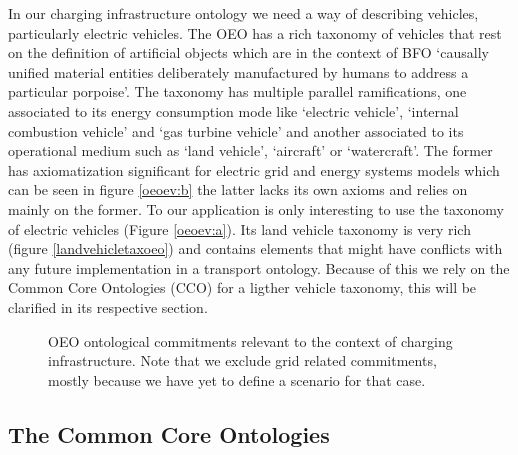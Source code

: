 In our charging infrastructure ontology we need a way of describing vehicles,
particularly electric vehicles. The OEO has a rich taxonomy of vehicles that
rest on the definition of artificial objects which are in the context of BFO
`causally unified material entities deliberately manufactured by humans to
address a particular porpoise'. The taxonomy has multiple parallel
ramifications, one associated to its energy consumption mode like `electric
vehicle', `internal combustion vehicle' and `gas turbine vehicle' and another
associated to its operational medium such as `land vehicle', `aircraft' or
`watercraft'. The former has axiomatization significant for electric grid and
energy systems models which can be seen in figure \ref{oeoev:b} the latter
lacks its own axioms and relies on mainly on the former. To our application is
only interesting to use the taxonomy of electric vehicles (Figure
\ref{oeoev:a}). Its land vehicle taxonomy is very rich (figure
\ref{landvehicletaxoeo}) and contains elements that might have conflicts with
any future implementation in a transport ontology. Because of this we rely on
the Common Core Ontologies (CCO) for a ligther vehicle taxonomy, this will be
clarified in its respective section.

\begin{figure}
    \centering
    \caption{OEO ontological commitments relevant to the context of charging infrastructure. Note that we exclude grid related commitments, mostly because we have yet to define a scenario for that case.}
\end{figure}

\subsection{The Common Core Ontologies}

